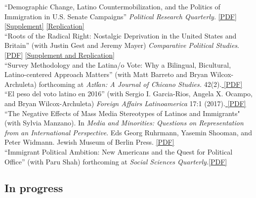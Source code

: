 \documentclass[11pt, a4paper]{article}
\newcommand{\years}[1]{\marginnote{\scriptsize #1}}
\begin{document}
\years{2017}``Demographic Change, Latino Countermobilization, and the Politics of Immigration in U.S. Senate Campaigns'' \textit{Political Research Quarterly.} \href{http://tylerreny.github.io/pdf/pubs/reny_2017_prq_final.pdf}{[PDF]} \href{http://tylerreny.github.io/pdf/pubs/reny_2017_prq_final_supp.pdf}{[Supplement]} \href{https://github.com/tylerreny/tylerreny.github.io/tree/master/replication/PRQ_2017}{[Replication]} \\
\years{2017}``Roots of the Radical Right: Nostalgic Deprivation in the United States and Britain'' (with Justin Gest and Jeremy Mayer) \textit{Comparative Political Studies}. \href{http://tylerreny.github.io/pdf/pubs/reny_2017_cps_final.pdf}{[PDF]} \href{https://github.com/tylerreny/tylerreny.github.io/tree/master/replication/CPS_2017}{[Supplement and Replication]}\\
\years{2017} ``Survey Methodology and the Latina/o Vote: Why a Bilingual, Bicultural, Latino-centered Approach Matters'' (with Matt Barreto and Bryan Wilcox-Archuleta) forthcoming at \textit{Aztl$\acute{a}$n: A Journal of Chicano Studies.} 42(2).\href{http://tylerreny.github.io/pdf/pubs/reny_2017_aztlan_final.pdf}{ [PDF]}\\
\years{2017} ``El peso del voto latino en 2016'' (with Sergio I. Garcia-Rios, Angela X. Ocampo, and Bryan Wilcox-Archuleta) \textit{Foreign Affairs Latinoamerica} 17:1 (2017).\href{http://tylerreny.github.io/pdf/pubs/reny_et_al_2017_foreign_affairs.pdf}{ [PDF]}\\
\years{2016} ``The Negative Effects of Mass Media Stereotypes of Latinos and Immigrants" (with Sylvia Manzano). In \textit{Media and Minorities: Questions on Representation from an International Perspective}. Eds Georg Ruhrmann, Yasemin Shooman, and Peter Widmann. Jewish Museum of Berlin Press. \href{http://tylerreny.github.io/pdf/pubs/reny_manzano_stereotypes_2016.pdf}{[PDF]}\\
\years{2016} ``Immigrant Political Ambition:  New Americans and the Quest for Political Office'' (with Paru Shah) forthcoming at \textit{Social Sciences Quarterly.}\href{https://www.dropbox.com/s/monmlmhaaowg5vp/Immigrant%20Political%20Ambition%20SSQ%20Final.pdf?dl=0}{[PDF]}\\


\subsection*{In progress}
\end{document}
